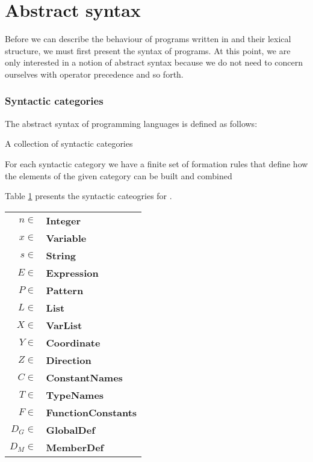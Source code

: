\section{Abstract syntax}
\label{sec:abstractsyntax}
Before we can describe the behaviour of programs written in \productname{} and
their lexical structure, we must first present the syntax of programs. At this
point, we are only interested in a notion of abstract syntax because we do not
need to concern ourselves with operator precedence and so forth.

\subsubsection{Syntactic categories}
The abstract syntax of programming languages is defined as follows\cite[p.
27]{tt-hh}:

\begin{dlist}
  \item A collection of syntactic categories
  \item For each syntactic category we have a finite set of formation rules
    that define how the elements of the given category can be built and combined
\end{dlist}

Table \ref{table:syn-cat} presents the syntactic cateogries for \productname{}.

\begin{table}[ht]
  \begin{center}
    \begin{tabular}{rl}
      \hline
      $n \in$ & \textbf{Integer}         \\
      $x \in$ & \textbf{Variable}        \\
      $s \in$ & \textbf{String}          \\
      $E \in$ & \textbf{Expression}      \\
      $P \in$ & \textbf{Pattern}         \\
      $L \in$ & \textbf{List}            \\
      $X \in$ & \textbf{VarList}         \\
      $Y \in$ & \textbf{Coordinate}      \\
      $Z \in$ & \textbf{Direction}       \\
      $C \in$ & \textbf{ConstantNames}   \\
      $T \in$ & \textbf{TypeNames}       \\
      $F \in$ & \textbf{FunctionConstants} \\
      $D_{G} \in$ & \textbf{GlobalDef}   \\
      $D_{M} \in$ & \textbf{MemberDef}   \\
      \hline
    \end{tabular}  
    \label{table:syn-cat}
  \end{center}
\end{table}

